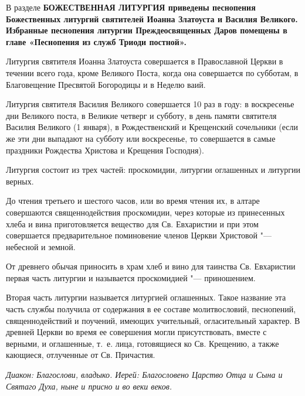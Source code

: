 

\label{_content_Liturgiya}



В разделе \bfseries БОЖЕСТВЕННАЯ ЛИТУРГИЯ\normalfont{} приведены песнопения Божественных литургий святителей Иоанна Златоуста и Василия Великого. Избранные песнопения литургии Преждеосвященных Даров помещены в главе «Песнопения из служб Триоди постной».


Литургия святителя Иоанна Златоуста совершается в Православной Церкви в течении всего года, кроме Великого Поста, когда она совершается по субботам, в Благовещение Пресвятой Богородицы и в Неделю ваий.


Литургия святителя Василия Великого совершается 10 раз в году: в воскресенье дни Великого поста, в Великие четверг и субботу, в день памяти святителя Василия Великого (1 января), в Рождественский и Крещенский сочельники (если же эти дни выпадают на субботу или воскресенье, то совершается в самые праздники Рождества Христова и Крещения Господня).

Литургия состоит из трех частей: проскомидии, литургии оглашенных и литургии верных.
 

 


До чтения третьего и шестого часов, или во время чтения их, в алтаре совершаются священнодействия проскомидии, через которые из принесенных хлеба и вина приготовляется вещество для Св. Евхаристии и при этом совершается предварительное поминовение членов Церкви Христовой "--- небесной и земной.


От древнего обычая приносить в храм хлеб и вино для таинства Св. Евхаристии первая часть литургии и называется проскомидией "--- приношением.
\mychapterending

 


Вторая часть литургии называется литургией оглашенных. Такое название эта часть службы получила от содержания в ее составе молитвословий, песнопений, священнодействий и поучений, имеющих учительный, огласительный характер. В древней Церкви во время ее совершения могли присутствовать, вместе с верными, и оглашенные, т.~е. лица, готовящиеся ко Св. Крещению, а также кающиеся, отлученные от Св. Причастия.


\itshape Диакон:\normalfont{} Благослови, владыко.
\itshape Иерей:\normalfont{} Благословено Царство Отца и Сына и Святаго Духа, ныне и присно и во веки веков. 


